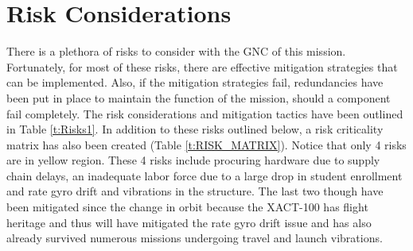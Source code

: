 \documentclass[conf]{new-aiaa}
\begin{document}
\section{Risk Considerations}
There is a plethora of risks to consider with the GNC of this mission. Fortunately, for most of these risks, there are effective mitigation strategies that can be implemented. Also, if the mitigation strategies fail, redundancies have been put in place to maintain the function of the mission, should a component fail completely. The risk considerations and mitigation tactics have been outlined in Table \ref{t:Risks1}. In addition to these risks outlined below, a risk criticality matrix has also been created (Table \ref{t:RISK_MATRIX}). Notice that only 4 risks are in yellow region. These 4 risks include procuring hardware due to supply chain delays, an inadequate labor force due to a large drop in student enrollment and rate gyro drift and vibrations in the structure. The last two though have been mitigated since the change in orbit because the XACT-100 has flight heritage and thus will have mitigated the rate gyro drift issue and has also already survived numerous missions undergoing travel and launch vibrations. 
\end{document}
